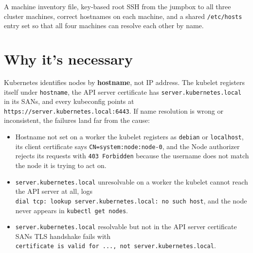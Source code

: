 \documentclass[11pt,oneside]{report}
\providecommand{\tightlist}{%
  \setlength{\itemsep}{0pt}\setlength{\parskip}{0pt}}
\begin{document}
A machine inventory
file, key-based root
SSH from the jumpbox
to all three cluster
machines, correct
hostnames on each
machine, and a
shared
\texttt{/etc/hosts}
entry set so that
all four machines
can resolve each
other by name.

\hypertarget{why-its-necessary-3}{%
\section{Why it's
necessary}\label{why-its-necessary-3}}

\begin{whybox}

Kubernetes
identifies nodes by
\textbf{hostname},
not IP address. The
kubelet registers
itself under
\texttt{hostname},
the API server
certificate has
\texttt{server.}\allowbreak{}\texttt{kubernetes.}\allowbreak{}\texttt{local}
in its SANs, and
every kubeconfig
points at
\texttt{https:}\allowbreak{}\texttt{/}\allowbreak{}\texttt{/}\allowbreak{}\texttt{server.}\allowbreak{}\texttt{kubernetes.}\allowbreak{}\texttt{local:}\allowbreak{}\texttt{6443}.
If name resolution
is wrong or
inconsistent, the
failures land far
from the cause:

\end{whybox}

\begin{itemize}
\tightlist
\item
  Hostname not set
  on a worker
  \textrightarrow{}
  the kubelet
  registers as
  \texttt{debian} or
  \texttt{localhost},
  its client
  certificate says
  \texttt{CN=system:}\allowbreak{}\texttt{node:}\allowbreak{}\texttt{node-}\allowbreak{}\texttt{0},
  and the Node
  authorizer rejects
  its requests with
  \texttt{403\ Forbidden}
  because the
  username does not
  match the node it
  is trying to act
  on.
\item
  \texttt{server.}\allowbreak{}\texttt{kubernetes.}\allowbreak{}\texttt{local}
  unresolvable on a
  worker
  \textrightarrow{}
  the kubelet cannot
  reach the API
  server at all,
  logs
  \texttt{dial\ tcp:}\allowbreak{}\texttt{\ lookup\ server.}\allowbreak{}\texttt{kubernetes.}\allowbreak{}\texttt{local:}\allowbreak{}\texttt{\ no\ such\ host},
  and the node never
  appears in
  \texttt{kubectl\ get\ nodes}.
\item
  \texttt{server.}\allowbreak{}\texttt{kubernetes.}\allowbreak{}\texttt{local}
  resolvable but not
  in the API server
  certificate SANs
  \textrightarrow{}
  TLS handshake
  fails with
  \texttt{certificate\ is\ valid\ for\ .}\allowbreak{}\texttt{.}\allowbreak{}\texttt{.}\allowbreak{}\texttt{,\ not\ server.}\allowbreak{}\texttt{kubernetes.}\allowbreak{}\texttt{local}.
\end{itemize}
\end{document}
